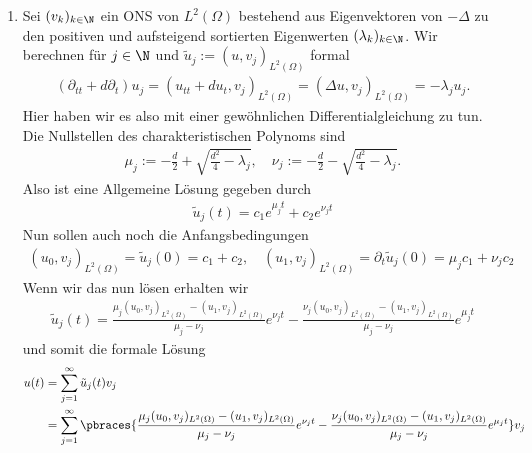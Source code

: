 \begin{solution}
\begin{enumerate}[label = (\roman*)]
    \item Sei $(v_k)_{k \in \N}$ ein ONS von $L^2(\Omega)$ bestehend aus Eigenvektoren von $- \Delta $ zu den positiven und aufsteigend sortierten Eigenwerten $(\lambda_k)_{k \in \N}$. Wir berechnen für $j \in \N$ und $\tilde{u}_j := (u,v_j)_{L^2(\Omega)}$ formal 
    \begin{align*}
    	(\partial_{tt} + d \partial_t)u_j = (u_{tt} + du_t, v_j)_{L^2(\Omega)} = (\Delta u, v_j)_{L^2(\Omega)} = -\lambda_j u_j.
    \end{align*}
	Hier haben wir es also mit einer gewöhnlichen Differentialgleichung zu tun. Die Nullstellen des charakteristischen Polynoms sind
	\begin{align*}
		\mu_j := - \frac{d}{2} + \sqrt{\frac{d^2}{4} - \lambda_j}, \quad \nu_j := - \frac{d}{2} - \sqrt{\frac{d^2}{4} - \lambda_j}.
	\end{align*}
	Also ist eine Allgemeine Lösung gegeben durch
	\begin{align*}
		\tilde{u}_j(t) = c_1 e^{\mu_j t} + c_2 e^{\nu_j t}
	\end{align*}
	Nun sollen auch noch die Anfangsbedingungen
	\begin{align*}
		(u_0, v_j)_{L^2(\Omega)} = \tilde{u}_j(0) = c_1 + c_2, \quad (u_1, v_j)_{L^2(\Omega)} = \partial_t \tilde{u}_j(0) = \mu_j c_1 + \nu_j c_2
	\end{align*}
	Wenn wir das nun lösen erhalten wir
	\begin{align*}
		\tilde{u}_j(t) = \frac{\mu_j(u_0, v_j)_{L^2(\Omega)} - (u_1, v_j)_{L^2(\Omega)}}{\mu_j - \nu_j} e^{\nu_j t} - \frac{\nu_j(u_0, v_j)_{L^2(\Omega)} - (u_1, v_j)_{L^2(\Omega)}}{\mu_j - \nu_j} e^{\mu_j t}
	\end{align*}
	und somit die formale Lösung
	\begin{align*}
		u(t) &= \sum_{j=1}^\infty \tilde{u}_j(t) v_j \\
		&= \sum_{j=1}^\infty \pbraces{\frac{\mu_j(u_0, v_j)_{L^2(\Omega)} - (u_1, v_j)_{L^2(\Omega)}}{\mu_j - \nu_j} e^{\nu_j t} - \frac{\nu_j(u_0, v_j)_{L^2(\Omega)} - (u_1, v_j)_{L^2(\Omega)}}{\mu_j - \nu_j} e^{\mu_j t}} v_j
	\end{align*}
	

\end{enumerate}
\end{solution}
